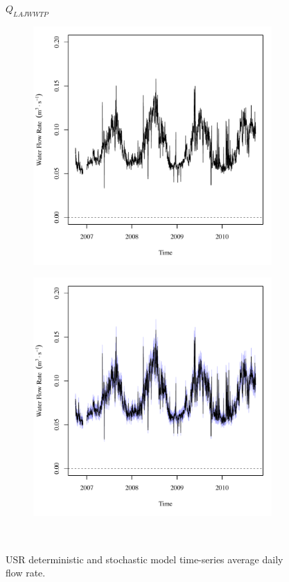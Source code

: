 \subfiguremid
\begin{landscape}
	\begin{figure}
		\centering
		$ Q_{LAJWWTP} $
		\begin{subfigure}{0.7\textwidth}
			\centering
			\includegraphics[width=\tableCustomSize]{"Figures/Results_USR/Deterministic/Q WTP"}
		\end{subfigure}%
		\begin{subfigure}{0.7\textwidth}
			\centering
			\includegraphics[width=\tableCustomSize]{"Figures/Results_USR/Stochastic/Q WTP"}
		\end{subfigure}\\
		\caption{USR deterministic and stochastic model time-series average daily flow rate.}
	\end{figure}
\end{landscape}
